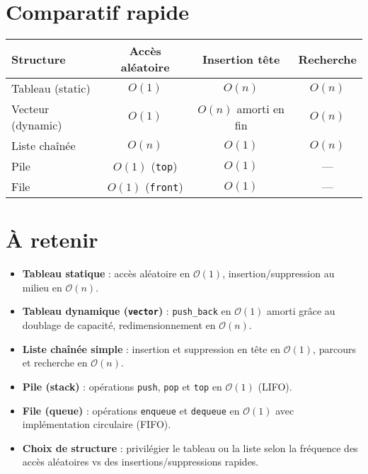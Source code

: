 \section{Comparatif rapide}

\begin{center}\small
\begin{tabular}{lccc}
\hline
\textbf{Structure} & \textbf{Accès aléatoire} & \textbf{Insertion tête} & \textbf{Recherche}\\
\hline
Tableau (static) & $O(1)$ & $O(n)$ & $O(n)$ \\
Vecteur (dynamic) & $O(1)$ & $O(n)$ amorti en fin & $O(n)$ \\
Liste chaînée & $O(n)$ & $O(1)$ & $O(n)$ \\
Pile & $O(1)$ (\lstinline|top|) & $O(1)$ & — \\
File & $O(1)$ (\lstinline|front|) & $O(1)$ & — \\
\hline
\end{tabular}
\end{center}

\section*{À retenir}

\begin{itemize}
  \item \textbf{Tableau statique} : accès aléatoire en $\mathcal{O}(1)$, insertion/suppression au milieu en $\mathcal{O}(n)$.
  \item \textbf{Tableau dynamique (\texttt{vector})} : \lstinline|push_back| en $\mathcal{O}(1)$ amorti grâce au doublage de capacité, redimensionnement en $\mathcal{O}(n)$.
  \item \textbf{Liste chaînée simple} : insertion et suppression en tête en $\mathcal{O}(1)$, parcours et recherche en $\mathcal{O}(n)$.
  \item \textbf{Pile (stack)} : opérations \lstinline|push|, \lstinline|pop| et \lstinline|top| en $\mathcal{O}(1)$ (LIFO).
  \item \textbf{File (queue)} : opérations \lstinline|enqueue| et \lstinline|dequeue| en $\mathcal{O}(1)$ avec implémentation circulaire (FIFO).
  \item \textbf{Choix de structure} : privilégier le tableau ou la liste selon la fréquence des accès aléatoires vs des insertions/suppressions rapides.
\end{itemize}


